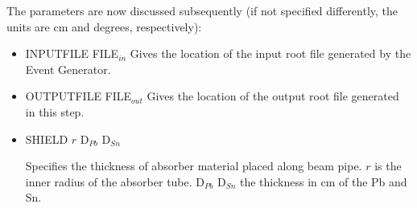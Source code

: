 \documentclass[12pt]{book}
\begin{document}
The parameters are now discussed subsequently (if not specified differently, 
the units are cm and degrees, respectively):\hfill{}
\begin{itemize}
\item INPUTFILE FILE$_{in}$ \hfill{} \linebreak
  Gives the location of the input root file generated by the Event Generator.
\item OUTPUTFILE FILE$_{out}$ \hfill{} \linebreak
  Gives the location of the output root file generated in this step.
\item SHIELD $r$ D$_{Pb}$ D$_{Sn}$ \hfill{} \linebreak 
  
  Specifies the thickness of absorber material placed along beam pipe. 
  $r$ is the inner radius of the absorber tube. D$_{Pb}$ D$_{Sn}$ the
  thickness in cm of the Pb and Sn.


\end{itemize}
\end{document}
